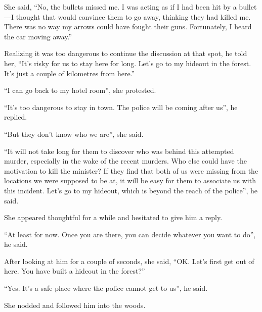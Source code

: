 She said, “No, the bullets missed me. I was acting as if I had been hit by a bullet—I
thought that would convince them to go away, thinking they had killed me. There
was no way my arrows could have fought their guns. Fortunately, I heard the car
moving away.”

Realizing it was too dangerous to continue the discussion at that spot, he told
her, “It's risky for us to stay here for long. Let's go to my hideout in the
forest. It's just a couple of kilometres from here.”

“I can go back to my hotel room”, she protested.

“It's too dangerous to stay in town. The police will be coming after us”, he
replied.

“But they don't know who we are”, she said.

“It will not take long for them to discover who was behind this attempted
murder, especially in the wake of the recent murders. Who else could have the
motivation to kill the minister? If they find that both of us were missing from
the locations we were supposed to be at, it will be easy for them to associate us
with this incident. Let's go to my hideout, which is beyond the reach of the
police”, he said.

She appeared thoughtful for a while and hesitated to give him a reply.

“At least for now. Once you are there, you can decide whatever you want to do”,
he said.

After looking at him for a couple of seconds, she said, “OK. Let's first get out
of here. You have built a hideout in the forest?”

“Yes. It's a safe place where the police cannot get to us”, he said.

She nodded and followed him into the woods.